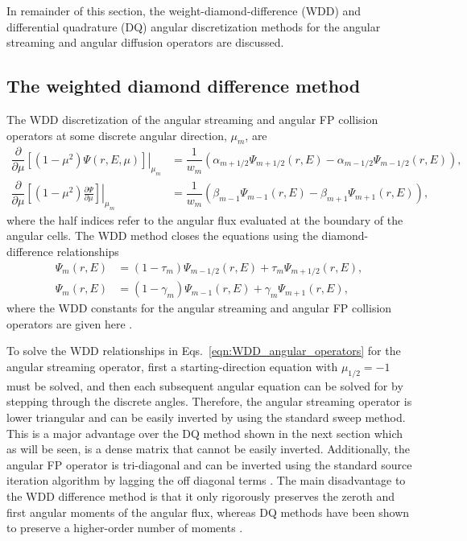 \documentclass[../main.tex]{subfiles}
\begin{document}
In remainder of this section, the weight-diamond-difference (WDD) and differential quadrature (DQ) angular discretization methods for the angular streaming and angular diffusion operators are discussed. 

\subsection{The weighted diamond difference method}
The WDD discretization of the angular streaming and angular FP collision operators at some discrete angular direction, $\mu_m$, are
\begin{subequations} \label{eqn:WDD_angular_operators}
    \begin{align}
        \dfrac{\partial}{\partial \mu} \left.\left[(1-\mu^2) \Psi(r,E,\mu) \right]\right|_{\mu_m} &= \dfrac{1}{w_m} \left( \alpha_{m+1/2} \Psi_{m+1/2}(r,E) - \alpha_{m-1/2} \Psi_{m-1/2}(r,E) \right), \\
        \dfrac{\partial}{\partial \mu} \left.\left[(1-\mu^2) \frac{\partial \Psi}{\partial \mu} \right]\right|_{\mu_m} &= \dfrac{1}{w_m} \left( \beta_{m-1} \Psi_{m-1}(r,E) - \beta_{m+1} \Psi_{m+1}(r,E) \right),
    \end{align}
\end{subequations} 
where the half indices refer to the angular flux evaluated at the boundary of the angular cells. The WDD method closes the equations using the diamond-difference relationships
\begin{subequations}
    \begin{align}
        \Psi_m(r,E) &= (1 - \tau_m) \Psi_{m-1/2}(r,E) + \tau_m \Psi_{m+1/2}(r,E), \\
        \Psi_m(r,E) &= (1 - \gamma_m) \Psi_{m-1}(r,E) + \gamma_m \Psi_{m+1}(r,E),
    \end{align}
\end{subequations}
where the WDD constants for the angular streaming and angular FP collision operators are given here \cite{Morel-1984} \cite{Morel-1985}.

To solve the WDD relationships in Eqs.~\eqref{eqn:WDD_angular_operators} for the angular streaming operator, first a starting-direction equation with $\mu_{1/2} = -1$ must be solved, and then each subsequent angular equation can be solved for by stepping through the discrete angles. Therefore, the angular streaming operator is lower triangular and can be easily inverted by using the standard \Sn sweep method. This is a major advantage over the DQ method shown in the next section which as will be seen, is a dense matrix that cannot be easily inverted. Additionally, the angular FP operator is tri-diagonal and can be inverted using the standard source iteration algorithm by lagging the off diagonal terms \cite{Morel-1985}. The main disadvantage to the WDD difference method is that it only rigorously preserves the zeroth and first angular moments of the angular flux, whereas DQ methods have been shown to preserve a higher-order number of moments \cite{Warsa-2012} \cite{Warsa-2006}.
\end{document}
